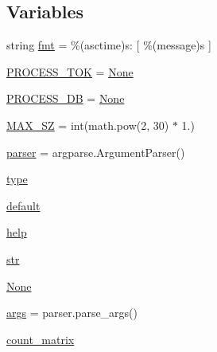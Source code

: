 \subsection*{Variables}
\begin{DoxyCompactItemize}
\item 
string \hyperlink{namespaceparlai_1_1agents_1_1tfidf__retriever_1_1build__tfidf_a8dc725902934e0c460f5a82fa332c521}{fmt} = \textquotesingle{}\%(asctime)s\+: \mbox{[} \%(message)s \mbox{]}\textquotesingle{}
\item 
\hyperlink{namespaceparlai_1_1agents_1_1tfidf__retriever_1_1build__tfidf_ae5c3818e71ddea3c79328d8a4c423047}{P\+R\+O\+C\+E\+S\+S\+\_\+\+T\+OK} = \hyperlink{namespaceparlai_1_1agents_1_1tfidf__retriever_1_1build__tfidf_ad50f77b70c0e27d3304395c58e9212c4}{None}
\item 
\hyperlink{namespaceparlai_1_1agents_1_1tfidf__retriever_1_1build__tfidf_a27ac3f448b895f9daae56e01bbf1be70}{P\+R\+O\+C\+E\+S\+S\+\_\+\+DB} = \hyperlink{namespaceparlai_1_1agents_1_1tfidf__retriever_1_1build__tfidf_ad50f77b70c0e27d3304395c58e9212c4}{None}
\item 
\hyperlink{namespaceparlai_1_1agents_1_1tfidf__retriever_1_1build__tfidf_ae004cad36f1e393ce6c158058a526eeb}{M\+A\+X\+\_\+\+SZ} = int(math.\+pow(2, 30) $\ast$ 1.)
\item 
\hyperlink{namespaceparlai_1_1agents_1_1tfidf__retriever_1_1build__tfidf_a21ca3f18c69cd5e11f4f9ec6505e0a24}{parser} = argparse.\+Argument\+Parser()
\item 
\hyperlink{namespaceparlai_1_1agents_1_1tfidf__retriever_1_1build__tfidf_ad5dfae268e23f506da084a9efb72f619}{type}
\item 
\hyperlink{namespaceparlai_1_1agents_1_1tfidf__retriever_1_1build__tfidf_a188ab17adbcc529b664e05f836f42918}{default}
\item 
\hyperlink{namespaceparlai_1_1agents_1_1tfidf__retriever_1_1build__tfidf_a0e12682c80997535ca4f7f293b8c6d10}{help}
\item 
\hyperlink{namespaceparlai_1_1agents_1_1tfidf__retriever_1_1build__tfidf_a213e3a3970a4f1423c2cc41e5f31295e}{str}
\item 
\hyperlink{namespaceparlai_1_1agents_1_1tfidf__retriever_1_1build__tfidf_ad50f77b70c0e27d3304395c58e9212c4}{None}
\item 
\hyperlink{namespaceparlai_1_1agents_1_1tfidf__retriever_1_1build__tfidf_aa48318cbcc3882ee8fe371c672cbf941}{args} = parser.\+parse\+\_\+args()
\item 
\hyperlink{namespaceparlai_1_1agents_1_1tfidf__retriever_1_1build__tfidf_afe20f2925824bab82a89672734347544}{count\+\_\+matrix}

\end{DoxyCompactItemize}
